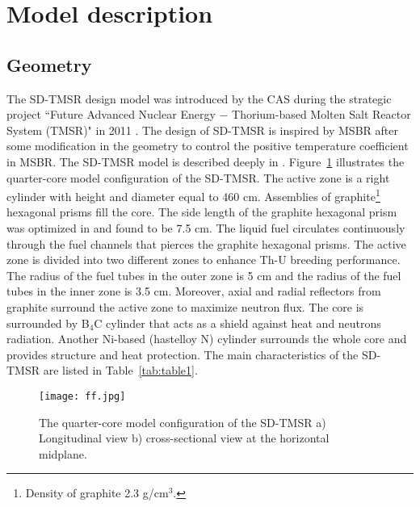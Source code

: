 \section{Model description}
\subsection{Geometry}
The \gls{SD-TMSR} design model was introduced by the \gls{CAS} during the strategic project ``Future Advanced Nuclear Energy $-$ Thorium-based Molten Salt Reactor System (TMSR)" in 2011 \cite{li_optimization_2018,jiang2012advanced,li2015analysis,li2017model}. The design of \gls{SD-TMSR} is inspired by \gls{MSBR} \cite{robertson_conceptual_1971} after some modification in the geometry to control the positive temperature coefficient in MSBR. The \gls{SD-TMSR} model is described deeply in \cite{li_optimization_2018}.
Figure~\ref{fig:ff} illustrates the quarter-core model configuration of the \gls{SD-TMSR}. The active zone is a right cylinder with height and diameter equal to 460 cm. Assemblies of graphite\footnote{Density of graphite 2.3 g/cm$^3$.} hexagonal prisms fill the core. The side length of the graphite hexagonal prism was optimized in \cite{li_optimization_2018} and found to be 7.5 cm. The liquid fuel circulates continuously through the fuel channels that pierces the graphite hexagonal prisms. The active zone is divided into two different zones to enhance Th-U breeding performance. The radius of the fuel tubes in the outer zone is 5 cm and the radius of the fuel tubes in the inner zone is 3.5 cm. Moreover, axial and radial reflectors from graphite surround the active zone to maximize neutron flux. The core is surrounded by B${_4}$C cylinder that acts as a shield against heat and neutrons radiation. 
Another Ni-based (hastelloy N) cylinder surrounds the whole core and provides structure and heat protection. The main characteristics of the \gls{SD-TMSR} are listed in Table~\ref{tab:table1}.

\begin{figure} %
	\texttt{[image: ff.jpg]}
	\caption{The quarter-core model configuration of the SD-TMSR a) Longitudinal view b) cross-sectional view at the horizontal midplane.}
	\label{fig:ff}
\end{figure}

